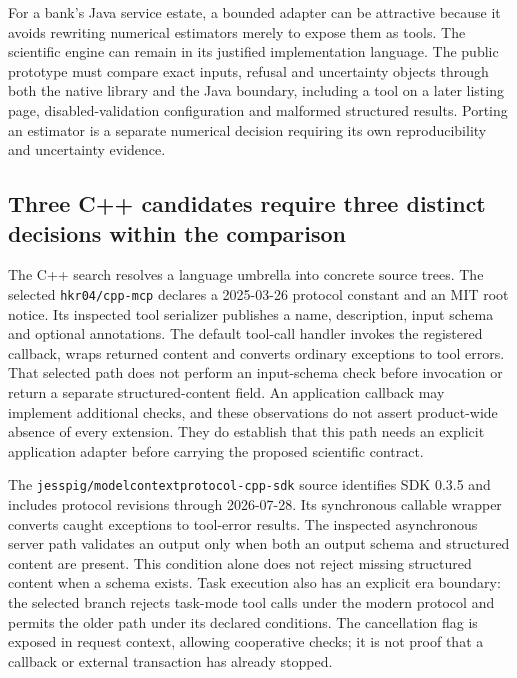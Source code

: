 For a bank's Java service estate, a bounded adapter can be attractive because
it avoids rewriting numerical estimators merely to expose them as tools.
The scientific engine can remain in its justified implementation language.
The public prototype must compare exact inputs, refusal and uncertainty
objects through both the native library and the Java boundary, including a
tool on a later listing page, disabled-validation configuration and malformed
structured results. Porting an estimator is a separate numerical decision
requiring its own reproducibility and uncertainty evidence.
\citep{exec24_mcp_java,exec24_mcp_contracts}

\subsection{Three C++ candidates require three distinct decisions within the comparison}

The C++ search resolves a language umbrella into concrete source trees.
The selected \texttt{hkr04/cpp-mcp} declares a 2025-03-26 protocol constant
and an MIT root notice. Its inspected tool serializer publishes a name,
description, input schema and optional annotations. The default tool-call
handler invokes the registered callback, wraps returned content and
converts ordinary exceptions to tool errors. That selected path does not
perform an input-schema check before invocation or return a separate
structured-content field. An application callback may implement additional
checks, and these observations do not assert product-wide absence of every
extension. They do establish that this path needs an explicit application
adapter before carrying the proposed scientific contract.
\citep{exec24_mcp_cpp_hkr}

The \texttt{jesspig/modelcontextprotocol-cpp-sdk} source identifies SDK 0.3.5
and includes protocol revisions through 2026-07-28. Its synchronous callable
wrapper converts caught exceptions to tool-error results. The inspected
asynchronous server path validates an output only when both an output schema
and structured content are present. This condition alone does not reject
missing structured content when a schema exists. Task execution also has
an explicit era boundary: the selected branch rejects task-mode tool calls
under the modern protocol and permits the older path under its declared
conditions. The cancellation flag is exposed in request context, allowing
cooperative checks; it is not proof that a callback or external transaction
has already stopped.~\citep{exec24_mcp_cpp_jesspig}

